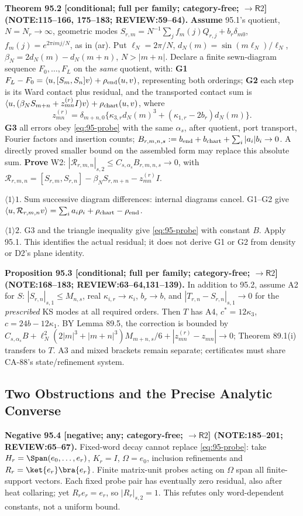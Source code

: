 \textbf{Theorem 95.2 [conditional; full per family; category-free; \(\to\mathsf R2\)] (NOTE:115--166, 175--183; REVIEW:59--64).}
\textbf{Assume} 95.1's quotient, \(N=N_r\to\infty\), geometric modes
\(S_{r,m}=N^{-1}\sum_j f_m(j)Q_{r,j}+b_r\delta_{m0}\), \(f_m(j)=e^{2\pi imj/N}\), as in (ar).
Put \(\ell_N=2\pi/N\), \(d_N(m)=\sin(m\ell_N)/\ell_N\), \(\beta_N=2d_N(m)-d_N(m+n)\), \(N>|m+n|\).
Declare a finite sewn-diagram sequence \(F_0,\ldots,F_L\) on the \emph{same} quotient, with:
\textbf{G1} \(F_L-F_0=\langle u,[S_m,S_n]v\rangle+\rho_{\rm end}(u,v)\), representing both orderings;
\textbf{G2} each step is its Ward contact plus residual, and the transported contact sum is
\(\langle u,(\beta_NS_{m+n}+z^{(r)}_{mn}I)v\rangle+\rho_{\rm chart}(u,v)\), where
\[
 z^{(r)}_{mn}=\delta_{m+n,0}\{\kappa_{3,r}d_N(m)^3+(\kappa_{1,r}-2b_r)d_N(m)\}.
\]
\textbf{G3} all errors obey \eqref{eq:95-probe} with the same \(\alpha_s\), after quotient, port transport,
Fourier factors and insertion counts; \(B_{r,m,n,s}:=b_{\rm end}+b_{\rm chart}+\sum_i|a_i|b_i\to0\).
A directly proved smaller bound on the assembled form may replace this absolute sum.
\textbf{Prove} W2: \(|\mathcal R_{r,m,n}|_{s,2}\le C_{s,\alpha_s}B_{r,m,n,s}\to0\), with
\(\mathcal R_{r,m,n}=[S_{r,m},S_{r,n}]-\beta_NS_{r,m+n}-z^{(r)}_{mn}I\).
\par\(\langle1\rangle1\). Sum successive diagram differences: internal diagrams cancel.
G1--G2 give \(\langle u,\mathcal R_{r,m,n}v\rangle=\sum_i a_i\rho_i+\rho_{\rm chart}-\rho_{\rm end}\).
\par\(\langle1\rangle2\). G3 and the triangle inequality give \eqref{eq:95-probe} with constant \(B\).
Apply 95.1. This identifies the actual residual; it does not derive G1 or G2 from density or D2's plane identity.

\textbf{Proposition 95.3 [conditional; full per family; category-free; \(\to\mathsf R2\)] (NOTE:168--183; REVIEW:63--64,131--139).}
In addition to 95.2, assume A2 for \(S\): \(|S_{r,n}|_{s,1}\le M_{n,s}\), real \(\kappa_{i,r}\to\kappa_i\), \(b_r\to b\),
and \(|T_{r,n}-S_{r,n}|_{s,1}\to0\) for the \emph{prescribed} KS modes at all required orders. Then \(T\) has A4,
\(c^*=12\kappa_3\), \(c=24b-12\kappa_1\). BY Lemma 89.5, the correction is bounded by
\(C_{s,\alpha_s}B+\ell_N^2(2|m|^3+|m+n|^3)M_{m+n,s}/6+|z^{(r)}_{mn}-z_{mn}|\to0\);
Theorem 89.1(i) transfers to \(T\). A3 and mixed brackets remain separate; certificates must share CA-88's state/refinement system.

\subsection{Two Obstructions and the Precise Analytic Converse}
\textbf{Negative 95.4 [negative; any; category-free; \(\to\mathsf R2\)] (NOTE:185--201; REVIEW:65--67).}
Fixed-word decay cannot replace \eqref{eq:95-probe}: take \(H_r=\Span(e_0,\ldots,e_r)\), \(K_r=I\),
\(\Omega=e_0\), inclusion refinements and \(R_r=\ket{e_r}\bra{e_r}\). Finite matrix-unit probes acting on \(\Omega\)
span all finite-support vectors. Each fixed probe pair has eventually zero residual, also after heat collaring;
yet \(R_re_r=e_r\), so \(|R_r|_{s,2}=1\). This refutes only word-dependent constants, not a uniform bound.

